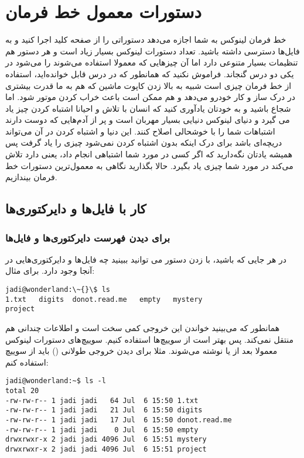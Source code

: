 \section{دستورات معمول خط فرمان}
خط فرمان لینوکس به شما اجازه می‌دهد دستوراتی را از صفحه کلید اجرا کنید و به فایل‌ها دسترسی داشته باشید. تعداد دستورات لینوکس بسیار زیاد است و هر دستور هم تنظیمات بسیار متنوعی دارد اما آن چیزهایی که معمولا استفاده می‌شوند را می‌شود در یکی دو درس گنجاند. فراموش نکنید که همانطور که در درس قابل خوانده‌اید، استفاده از خط فرمان چیزی است شبیه به بالا زدن کاپوت ماشین که هم به ما قدرت بیشتری در درک ساز و کار خودرو می‌دهد و هم ممکن است باعث خراب کردن موتور شود.
اما شجاع باشید و به خودتان یادآوری کنید که انسان با تلاش و احیانا اشتباه کردن چیز یاد می گیرد و دنیای لینوکس دنیایی بسیار مهربان است و پر از آدم‌هایی که دوست دارند اشتباهات شما را با خوشحالی اصلاح کنند. این دنیا و اشتباه کردن در آن می‌تواند دریچه‌ای باشد برای درک اینکه بدون اشتباه کردن نمی‌شود چیزی را یاد گرفت پس همیشه یادتان نگه‌دارید که اگر کسی در مورد شما اشتباهی انجام داد،‌ یعنی دارد تلاش می‌کند در مورد شما چیزی یاد بگیرد.
حالا بگذارید نگاهی به معمول‌ترین دستورات خط فرمان بیندازیم.
\subsection*{کار با فایل‌ها و دایرکتوری‌ها}
\subsubsection*{ برای دیدن فهرست دایرکتوری‌ها و فایل‌ها}
در هر جایی که باشید، با زدن دستور  می توانید ببینید چه فایل‌ها و دایرکتوری‌هایی در آنجا وجود دارد. برای مثال:
\begin{frameng}
\begin{lstlisting}
jadi@wonderland:\~{}\$ ls
1.txt	digits	donot.read.me	empty	mystery
project
\end{lstlisting}
\end{frameng}

همانطور که می‌بینید خواندن این خروجی کمی سخت است و اطلاعات چندانی هم منتقل نمی‌کند. پس بهتر است از سوییچ‌ها استفاده کنیم. سوییچ‌های دستورات لینوکس معمولا بعد از
\lr{-}
یا
\lr{-{}-}
 نوشته می‌شوند. مثلا برای دیدن خروجی طولانی‌ () باید از سوییچ  استفاده کنم:
\begin{frameng}
\begin{lstlisting}
jadi@wonderland:~$ ls -l
total 20
-rw-rw-r-- 1 jadi jadi   64 Jul  6 15:50 1.txt
-rw-rw-r-- 1 jadi jadi   21 Jul  6 15:50 digits
-rw-rw-r-- 1 jadi jadi   17 Jul  6 15:50 donot.read.me
-rw-rw-r-- 1 jadi jadi    0 Jul  6 15:50 empty
drwxrwxr-x 2 jadi jadi 4096 Jul  6 15:51 mystery
drwxrwxr-x 2 jadi jadi 4096 Jul  6 15:51 project
\end{lstlisting}
\end{frameng}

